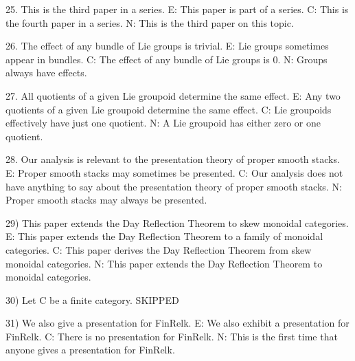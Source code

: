 25. This is the third paper in a series.
E: This paper is part of a series.
C: This is the fourth paper in a series.
N: This is the third paper on this topic.

26. The effect of any bundle of Lie groups is trivial.
E: Lie groups sometimes appear in bundles.
C: The effect of any bundle of Lie groups is 0.
N: Groups always have effects.

27.  All quotients of a given Lie groupoid determine the same effect.
E:  Any two quotients of a given Lie groupoid determine the same effect.
C: Lie groupoids effectively have just one quotient.
N: A Lie groupoid has either zero or one quotient.

28. Our analysis is relevant to the presentation theory of proper smooth stacks.
E: Proper smooth stacks may sometimes be presented.
C: Our analysis does not have anything to say about the presentation theory of proper smooth stacks.
N: Proper smooth stacks may always be presented.

29) This paper extends the Day Reflection Theorem to skew monoidal categories.
E:  This paper extends the Day Reflection Theorem to a family of monoidal categories.
C: This paper derives the Day Reflection Theorem from skew monoidal categories.
N: This paper extends the Day Reflection Theorem to monoidal categories.

30) Let C be a finite category.
SKIPPED

31) We also give a presentation for FinRelk.
E: We also exhibit a presentation for FinRelk.
C: There is no presentation for FinRelk.
N: This is the first time that anyone gives a presentation for FinRelk.

 

